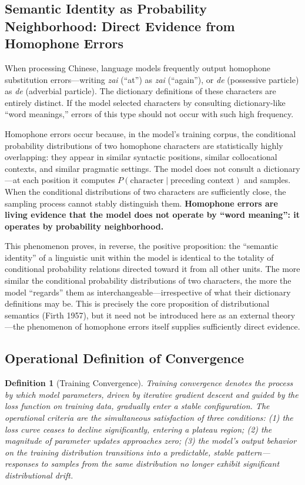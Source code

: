 \documentclass[11pt,a4paper]{article}
\newtheorem{definition}[theorem]{Definition}
\theoremstyle{definition}
\begin{document}
\subsection{Semantic Identity as Probability Neighborhood: Direct Evidence from Homophone Errors}

When processing Chinese, language models frequently output homophone substitution errors---writing \emph{zai} (``at'') as \emph{zai} (``again''), or \emph{de} (possessive particle) as \emph{de} (adverbial particle). The dictionary definitions of these characters are entirely distinct. If the model selected characters by consulting dictionary-like ``word meanings,'' errors of this type should not occur with such high frequency.

Homophone errors occur because, in the model's training corpus, the conditional probability distributions of two homophone characters are statistically highly overlapping: they appear in similar syntactic positions, similar collocational contexts, and similar pragmatic settings. The model does not consult a dictionary---at each position it computes $P(\text{character} \mid \text{preceding context})$ and samples. When the conditional distributions of two characters are sufficiently close, the sampling process cannot stably distinguish them. \textbf{Homophone errors are living evidence that the model does not operate by ``word meaning'': it operates by probability neighborhood.}

This phenomenon proves, in reverse, the positive proposition: the ``semantic identity'' of a linguistic unit within the model is identical to the totality of conditional probability relations directed toward it from all other units. The more similar the conditional probability distributions of two characters, the more the model ``regards'' them as interchangeable---irrespective of what their dictionary definitions may be. This is precisely the core proposition of distributional semantics (Firth 1957), but it need not be introduced here as an external theory---the phenomenon of homophone errors itself supplies sufficiently direct evidence.

\subsection{Operational Definition of Convergence}

\begin{definition}[Training Convergence]
Training convergence denotes the process by which model parameters, driven by iterative gradient descent and guided by the loss function on training data, gradually enter a stable configuration. The operational criteria are the simultaneous satisfaction of three conditions: (1) the loss curve ceases to decline significantly, entering a plateau region; (2) the magnitude of parameter updates approaches zero; (3) the model's output behavior on the training distribution transitions into a predictable, stable pattern---responses to samples from the same distribution no longer exhibit significant distributional drift.
\end{definition}
\end{document}
